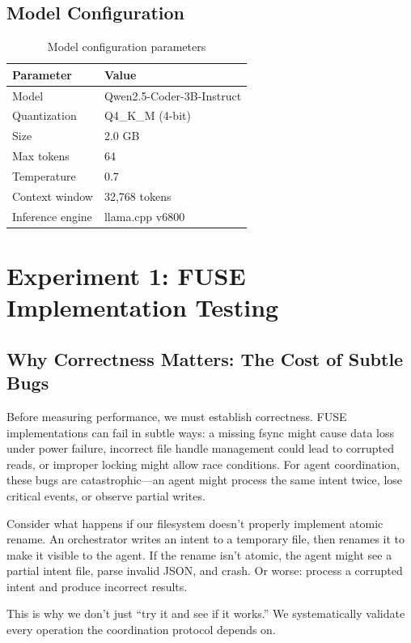 \documentclass[11pt]{article}
\begin{document}
\subsection{Model Configuration}

\begin{table}[h]
\centering
\begin{tabular}{ll}
\toprule
\textbf{Parameter} & \textbf{Value} \\
\midrule
Model & Qwen2.5-Coder-3B-Instruct \\
Quantization & Q4\_K\_M (4-bit) \\
Size & 2.0 GB \\
Max tokens & 64 \\
Temperature & 0.7 \\
Context window & 32,768 tokens \\
Inference engine & llama.cpp v6800 \\
\bottomrule
\end{tabular}
\caption{Model configuration parameters}
\end{table}

\section{Experiment 1: FUSE Implementation Testing}

\subsection{Why Correctness Matters: The Cost of Subtle Bugs}

Before measuring performance, we must establish correctness. FUSE implementations can fail in subtle ways: a missing fsync might cause data loss under power failure, incorrect file handle management could lead to corrupted reads, or improper locking might allow race conditions. For agent coordination, these bugs are catastrophic---an agent might process the same intent twice, lose critical events, or observe partial writes.

Consider what happens if our filesystem doesn't properly implement atomic rename. An orchestrator writes an intent to a temporary file, then renames it to make it visible to the agent. If the rename isn't atomic, the agent might see a partial intent file, parse invalid JSON, and crash. Or worse: process a corrupted intent and produce incorrect results.

This is why we don't just ``try it and see if it works.'' We systematically validate every operation the coordination protocol depends on.
\end{document}
